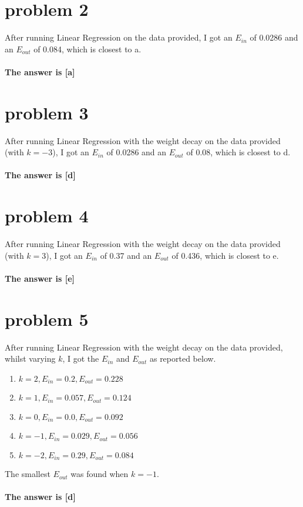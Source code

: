 \documentclass{article}
\begin{document}
\section*{problem 2}
After running Linear Regression on the data provided, I got an $E_{in}$ of 0.0286 and an $E_{out}$ of 0.084, which is closest to a.\\\\
\textbf{The answer is [a]}

\section*{problem 3}
After running Linear Regression with the weight decay on the data provided (with $k = -3$), I got an $E_{in}$ of 0.0286 and an $E_{out}$ of 0.08, which is closest to d.\\\\
\textbf{The answer is [d]}

\section*{problem 4}
After running Linear Regression with the weight decay on the data provided (with $k = 3$), I got an $E_{in}$ of 0.37 and an $E_{out}$ of 0.436, which is closest to e.\\\\
\textbf{The answer is [e]}

\section*{problem 5}
After running Linear Regression with the weight decay on the data provided, whilst varying $k$, I got the $E_{in}$ and $E_{out}$ as reported below.
\begin{center}
    \begin{enumerate}[label=(\alph*)]
        \item $k = 2, E_{in} = 0.2, E_{out} = 0.228$
        \item $k = 1, E_{in} = 0.057, E_{out} = 0.124$
        \item $k = 0, E_{in} = 0.0, E_{out} = 0.092$
        \item $k = -1, E_{in} = 0.029, E_{out} = 0.056$
        \item $k = -2, E_{in} = 0.29, E_{out} = 0.084$
    \end{enumerate}
\end{center}
The smallest $E_{out}$ was found when $k = -1$.\\\\
\textbf{The answer is [d]}
\end{document}
